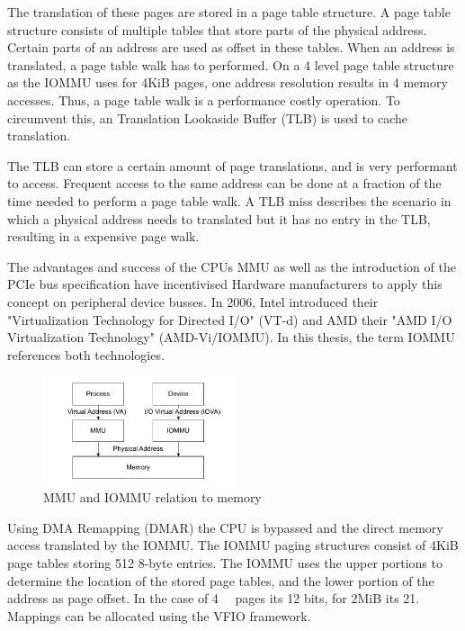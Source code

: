 The translation of these pages are stored in a page table structure. A page table structure consists of multiple tables that store parts of the physical address. Certain parts of an address are used as offset in these tables. When an address is translated, a page table walk has to performed. On a 4 level page table structure as the IOMMU uses for 4KiB pages, one address resolution results in 4 memory accesses. Thus, a page table walk is a performance costly operation. To circumvent this, an Translation Lookaside Buffer (TLB) is used to cache translation.

The TLB can store a certain amount of page translations, and is very performant to access. Frequent access to the same address can be done at a fraction of the time needed to perform a page table walk. A TLB miss describes the scenario in which a physical address needs to translated but it has no entry in the TLB, resulting in a expensive page walk.

The advantages and success of the CPUs MMU as well as the introduction of the PCIe bus specification have incentivised Hardware manufacturers to apply this concept on peripheral device busses. In 2006, Intel introduced their "Virtualization Technology for Directed I/O" (VT-d) and AMD their "AMD I/O Virtualization Technology" (AMD-Vi/IOMMU). In this thesis, the term IOMMU references both technologies.

\begin{figure}
    \centering
    \includegraphics[width=0.5\textwidth]{figures/MMUIOMMU.pdf}
    \caption{MMU and IOMMU relation to memory}
    \label{fig:mmuvsiommu}
\end{figure}

Using DMA Remapping (DMAR) the CPU is bypassed and the direct memory access translated by the IOMMU.
The IOMMU paging structures consist of 4KiB page tables storing 512 8-byte entries. The IOMMU uses the upper portions to determine the location of the stored page tables, and the lower portion of the address as page offset. In the case of \qty{4}{\kibi\byte} pages its 12 bits, for 2MiB its 21.
Mappings can be allocated using the VFIO framework.

